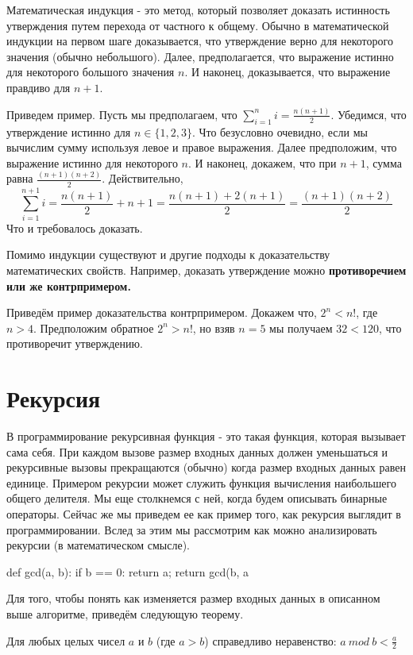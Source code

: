 Математическая индукция - это метод, который позволяет доказать истинность утверждения
путем перехода от частного к общему. Обычно в математической индукции на первом шаге
доказывается, что утверждение верно для некоторого значения (обычно небольшого). Далее,
предполагается, что выражение истинно для некоторого большого значения $n$. И наконец, 
доказывается, что выражение правдиво для $n+1$.

Приведем пример. Пусть мы предполагаем, что $\sum_{i=1}^n i=\frac{n(n+1)}{2}$. Убедимся, что утверждение
истинно для $n \in \{1, 2, 3\}$. Что безусловно очевидно, если мы вычислим сумму используя левое и правое выражения.
Далее предположим, что выражение истинно для некоторого $n$. И наконец, докажем, что при $n+1$, сумма равна $\frac{(n+1)(n+2)}{2}$. Действительно, $$\sum_{i=1}^{n+1} i=\frac{n(n+1)}{2} + n+1 = \frac{n(n+1) + 2(n+1)}{2} = \frac{(n+1)(n+2)}{2}$$ Что и требовалось доказать.

Помимо индукции существуют и другие подходы к доказательству математических свойств. Например,
доказать утверждение можно \bf{противоречием} или же контрпримером. 

Приведём пример доказательства контрпримером. Докажем что, $2^n<n!$, где $n>4$. Предположим обратное 
$2^n>n!$, но взяв $n=5$ мы получаем $32<120$, что противоречит утверждению.

\section{Рекурсия}

В программирование рекурсивная функция - это такая функция, которая вызывает сама себя. При 
каждом вызове размер входных данных должен уменьшаться и рекурсивные вызовы
прекращаются (обычно) когда размер входных данных равен единице. Примером рекурсии 
может служить функция вычисления наибольшего общего делителя. Мы еще столкнемся с ней,
когда будем описывать бинарные операторы. Сейчас же мы приведем ее как пример 
того, как рекурсия выглядит в программировании. Вслед за этим мы рассмотрим как
можно анализировать рекурсии (в математическом смысле).

\begin{python}
def gcd(a, b):
 if b == 0:
  return a;
 return gcd(b, a %
\end{python}

Для того, чтобы понять как изменяется размер входных данных в описанном выше алгоритме, 
приведём следующую теорему.

\begin{theorem}
Для любых целых чисел $a$ и $b$ (где $a>b$) справедливо неравенство: $a\ mod\ b < \frac{a}{2}$
\end{theorem}

